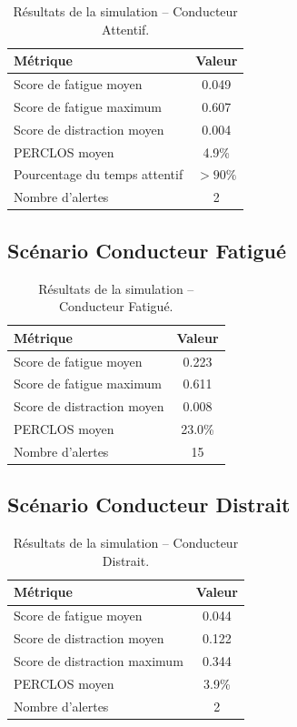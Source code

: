 \begin{table}[H]
\centering
\caption{Résultats de la simulation -- Conducteur Attentif.}
\label{tab:sim_attentif}
\renewcommand{\arraystretch}{1.3}
\begin{tabular}{|l|c|}
\hline
\rowcolor{green!15}
\textbf{Métrique} & \textbf{Valeur} \\
\hline
Score de fatigue moyen & 0.049 \\
\hline
Score de fatigue maximum & 0.607 \\
\hline
Score de distraction moyen & 0.004 \\
\hline
PERCLOS moyen & 4.9\% \\
\hline
Pourcentage du temps attentif & $> 90\%$ \\
\hline
Nombre d'alertes & 2 \\
\hline
\end{tabular}
\end{table}

\subsection{Scénario Conducteur Fatigué}

\begin{table}[H]
\centering
\caption{Résultats de la simulation -- Conducteur Fatigué.}
\label{tab:sim_fatigue}
\renewcommand{\arraystretch}{1.3}
\begin{tabular}{|l|c|}
\hline
\rowcolor{alertorange!20}
\textbf{Métrique} & \textbf{Valeur} \\
\hline
Score de fatigue moyen & 0.223 \\
\hline
Score de fatigue maximum & 0.611 \\
\hline
Score de distraction moyen & 0.008 \\
\hline
PERCLOS moyen & 23.0\% \\
\hline
Nombre d'alertes & 15 \\
\hline
\end{tabular}
\end{table}

\subsection{Scénario Conducteur Distrait}

\begin{table}[H]
\centering
\caption{Résultats de la simulation -- Conducteur Distrait.}
\label{tab:sim_distrait}
\renewcommand{\arraystretch}{1.3}
\begin{tabular}{|l|c|}
\hline
\rowcolor{purple!15}
\textbf{Métrique} & \textbf{Valeur} \\
\hline
Score de fatigue moyen & 0.044 \\
\hline
Score de distraction moyen & 0.122 \\
\hline
Score de distraction maximum & 0.344 \\
\hline
PERCLOS moyen & 3.9\% \\
\hline
Nombre d'alertes & 2 \\
\hline
\end{tabular}
\end{table}

